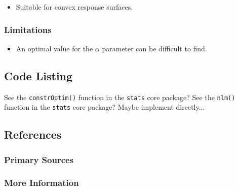 \begin{itemize}
	\item Suitable for convex response surfaces.
\end{itemize}

\subsubsection{Limitations}

\begin{itemize}
	\item An optimal value for the $\alpha$ parameter can be difficult to find.
\end{itemize}

\subsection{Code Listing}

See the \texttt{constrOptim()} function in the \texttt{stats} core package?
See the \texttt{nlm()} function in the \texttt{stats} core package?
Maybe implement directly...

\subsection{References}

\subsubsection{Primary Sources}


\subsubsection{More Information}




